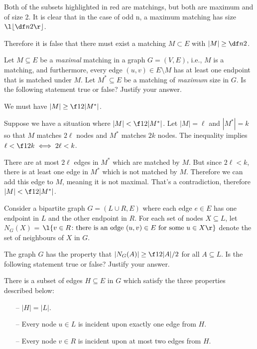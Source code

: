\documentclass[a4paper]{article}
\begin{document}
Both of the subsets highlighted in red are matchings, but both are maximum and of size 2. It is clear that in the case of odd n, a maximum matching has size $\l\lfloor \df n2 \r\rfloor$.

Therefore it is false that there must exist a matching $M \subset E$ with $|M| \ge \df n2$.



\begin{questionbody}
Let $M \subseteq E$ be a \textit{maximal} matching in a graph $G = (V, E)$, i.e., $M$ is a matching, and furthermore, every edge $(u, v) \in E \setminus M$ has at least one endpoint that is matched under $M$. Let $M^* \subseteq E$ be a matching of \textit{maximum} size in $G$. Is the following statement true or false? Justify your answer.

We must have $|M| \ge \f12 |M^*|$.
\end{questionbody}

Suppose we have a situation where $|M| < \f12 |M^*|$. Let $|M| = \ell$ and $|M^*| = k$ so that $M$ matches $2\ell$ nodes and $M^*$ matches $2k$ nodes. The inequality implies $\ell < \f12 k \iff 2\ell < k$.

There are at most $2\ell$ edges in $M^*$ which are matched by $M$. But since $2\ell < k$, there is at least one edge in $M^*$ which is not matched by $M$. Therefore we can add this edge to $M$, meaning it is not maximal. That's a contradiction, therefore $|M| < \f12 |M^*|$.



\begin{questionbody}
Consider a bipartite graph $G = (L \cup R, E)$ where each edge $e \in E$ has one endpoint in $L$ and the other endpoint in $R$. For each set of nodes $X \subseteq L$, let $N_G(X)$ = $\l\{v \in R \colon \text{there is an edge } (u, v) \in E \text{ for some } u \in X \r\}$ denote the set of neighbours of $X$ in $G$.

The graph $G$ has the property that $|N_G(A)| \ge \f12 |A|/2$ for all $A \subseteq L$. Is the following statement true or false? Justify your answer.

There is a subset of edges $H \subseteq E$ in $G$ which satisfy the three properties described below:
\vspace*{-1em}
\begin{itemize}
    \item[--] $|H| = |L|$.
    \item[--] Every node $u \in L$ is incident upon exactly one edge from $H$.
    \item[--] Every node $v \in R$ is incident upon at most two edges from $H$.
\end{itemize}
\end{questionbody}
\end{document}
